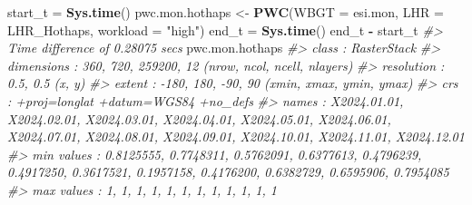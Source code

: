 \documentclass[
]{article}
\newenvironment{Shaded}{\begin{snugshade}}{\end{snugshade}}
\newcommand{\AttributeTok}[1]{\textcolor[rgb]{0.13,0.29,0.53}{#1}}
\newcommand{\CommentTok}[1]{\textcolor[rgb]{0.56,0.35,0.01}{\textit{#1}}}
\newcommand{\FunctionTok}[1]{\textcolor[rgb]{0.13,0.29,0.53}{\textbf{#1}}}
\newcommand{\NormalTok}[1]{#1}
\newcommand{\OtherTok}[1]{\textcolor[rgb]{0.56,0.35,0.01}{#1}}
\newcommand{\SpecialCharTok}[1]{\textcolor[rgb]{0.81,0.36,0.00}{\textbf{#1}}}
\newcommand{\StringTok}[1]{\textcolor[rgb]{0.31,0.60,0.02}{#1}}
\begin{document}
\begin{Shaded}
\begin{Highlighting}[]
\NormalTok{start\_t }\OtherTok{=} \FunctionTok{Sys.time}\NormalTok{()}
\NormalTok{pwc.mon.hothaps }\OtherTok{\textless{}{-}} \FunctionTok{PWC}\NormalTok{(}\AttributeTok{WBGT =}\NormalTok{ esi.mon,  }\AttributeTok{LHR =}\NormalTok{ LHR\_Hothaps, }\AttributeTok{workload =} \StringTok{"high"}\NormalTok{)}
\NormalTok{end\_t }\OtherTok{=} \FunctionTok{Sys.time}\NormalTok{()}
\NormalTok{end\_t }\SpecialCharTok{{-}}\NormalTok{ start\_t}
\CommentTok{\#\textgreater{} Time difference of 0.28075 secs}
\NormalTok{pwc.mon.hothaps}
\CommentTok{\#\textgreater{} class      : RasterStack }
\CommentTok{\#\textgreater{} dimensions : 360, 720, 259200, 12  (nrow, ncol, ncell, nlayers)}
\CommentTok{\#\textgreater{} resolution : 0.5, 0.5  (x, y)}
\CommentTok{\#\textgreater{} extent     : {-}180, 180, {-}90, 90  (xmin, xmax, ymin, ymax)}
\CommentTok{\#\textgreater{} crs        : +proj=longlat +datum=WGS84 +no\_defs }
\CommentTok{\#\textgreater{} names      : X2024.01.01, X2024.02.01, X2024.03.01, X2024.04.01, X2024.05.01, X2024.06.01, X2024.07.01, X2024.08.01, X2024.09.01, X2024.10.01, X2024.11.01, X2024.12.01 }
\CommentTok{\#\textgreater{} min values :   0.8125555,   0.7748311,   0.5762091,   0.6377613,   0.4796239,   0.4917250,   0.3617521,   0.1957158,   0.4176200,   0.6382729,   0.6595906,   0.7954085 }
\CommentTok{\#\textgreater{} max values :           1,           1,           1,           1,           1,           1,           1,           1,           1,           1,           1,           1}
\end{Highlighting}
\end{Shaded}
\end{document}
